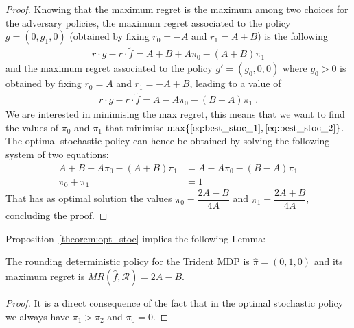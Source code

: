 \begin{proof}
Knowing that the maximum regret is the maximum among two choices for the adversary policies, the maximum regret associated to the policy $g =(0, g_1, 0)$ (obtained by fixing $r_0 = -A$ and $r_1 = A+B$) is the following
\begin{align}
r \cdot g - r \cdot \tilde{f} = A + B +A \pi_0 -(A+B)\pi_1 \label{eq:best_stoc_1}
\end{align}   
and the maximum regret associated to the policy $g' = (g_0, 0, 0)$ where $g_0 > 0$ is obtained by fixing $r_0 = A$ and $r_1 = -A+B$, leading to a value of
\begin{align}
r \cdot g - r \cdot \tilde{f}  = A - A \pi_0 -(B-A)\pi_1 \label{eq:best_stoc_2}\;.
\end{align}   
We are interested in minimising the max regret, this means that we want to find the values of $\pi_0$ and $\pi_1$ that minimise $\max \{\eqref{eq:best_stoc_1}, \eqref{eq:best_stoc_2}\}$. The optimal stochastic policy can hence be obtained by solving the following system of two equations: 
\begin{align*}
A + B +A \pi_0 -(A+B)\pi_1 &= A - A \pi_0 -(B-A)\pi_1\\
\pi_0+\pi_1 &= 1
\end{align*} 
That has as optimal solution the values $\pi_{0}=\dfrac{2A - B}{4A}$ and $\pi_{1}=\dfrac{2A + B}{4A}$, concluding the proof.
\end{proof}


Proposition~\ref{theorem:opt_stoc} implies the following Lemma:
\begin{lemma}\label{lemma:heur_policy}
The rounding deterministic policy for the Trident MDP is $\hat{\pi} = (0, 1, 0)$ %
and its maximum regret is $MR(\hat{f}, \mathcal{R}) = 2A-B$.
\end{lemma}
\begin{proof}
It is a direct consequence of the fact that in the optimal stochastic policy we always have $\pi_1 > \pi_2$ and $\pi_0 = 0$.
\end{proof}

